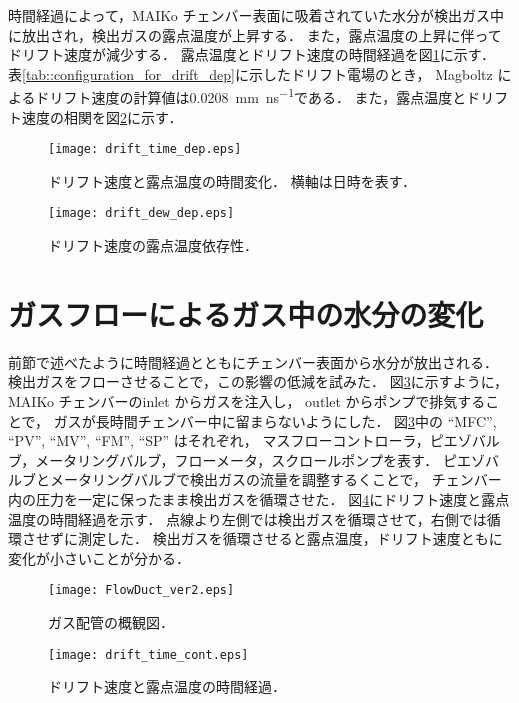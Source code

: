 \documentclass[../master]{subfiles}
\begin{document}
時間経過によって，MAIKo チェンバー表面に吸着されていた水分が検出ガス中に放出され，検出ガスの露点温度が上昇する．
また，露点温度の上昇に伴ってドリフト速度が減少する．
露点温度とドリフト速度の時間経過を図\ref{fig::drift_time_dep}に示す．
表\ref{tab::configuration_for_drift_dep}に示したドリフト電場のとき，
Magboltz によるドリフト速度の計算値は\SI{0.0208}{\milli\metre\per\nano\second}である．
また，露点温度とドリフト速度の相関を図\ref{fig::drift_dew_dep}に示す．
\begin{figure}
  \centering
  \texttt{[image: drift\_time\_dep.eps]}
  \caption[ドリフト速度と露点温度の時間変化．]
          {ドリフト速度と露点温度の時間変化．
          横軸は日時を表す．}
  \label{fig::drift_time_dep}
\end{figure}
\begin{figure}
  \centering
  \texttt{[image: drift\_dew\_dep.eps]}
  \caption{ドリフト速度の露点温度依存性．}
  \label{fig::drift_dew_dep}
\end{figure}

\section{ガスフローによるガス中の水分の変化}
前節で述べたように時間経過とともにチェンバー表面から水分が放出される．
検出ガスをフローさせることで，この影響の低減を試みた．
図\ref{fig::gas_duct}に示すように，MAIKo チェンバーのinlet からガスを注入し，
outlet からポンプで排気することで，
ガスが長時間チェンバー中に留まらないようにした．
図\ref{fig::gas_duct}中の ``MFC'', ``PV'', ``MV'', ``FM'', ``SP'' はそれぞれ，
マスフローコントローラ，ピエゾバルブ，メータリングバルブ，フローメータ，スクロールポンプを表す．
ピエゾバルブとメータリングバルブで検出ガスの流量を調整するくことで，
チェンバー内の圧力を一定に保ったまま検出ガスを循環させた．
図\ref{fig::drift_time_cont}にドリフト速度と露点温度の時間経過を示す．
点線より左側では検出ガスを循環させて，右側では循環させずに測定した．
検出ガスを循環させると露点温度，ドリフト速度ともに変化が小さいことが分かる．
\begin{figure}
  \centering
  \texttt{[image: FlowDuct\_ver2.eps]}
  \caption{ガス配管の概観図．}
  \label{fig::gas_duct}
\end{figure}
\begin{figure}
  \centering
  \texttt{[image: drift\_time\_cont.eps]}
  \caption{ドリフト速度と露点温度の時間経過．}
  \label{fig::drift_time_cont}
\end{figure}
\end{document}
